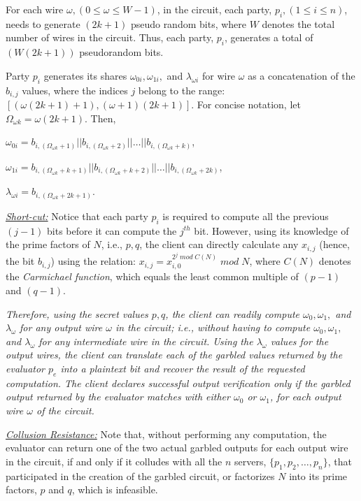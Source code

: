 \documentclass[10pt,journal,cspaper,compsoc]{IEEEtran}
\begin{document}
For each wire $\omega, (0\le \omega \le W-1)$, in the circuit, each party, $p_i, (1\le i\le n)$, needs to generate $(2k+1)$ pseudo random bits, where $W$ denotes the total number of wires in the circuit. Thus, each party, $p_i$, generates a total of $(W(2k+1))$ pseudorandom bits.


Party $p_i$ generates its shares $\omega_{0i},\omega_{1i},$ and $\lambda_{\omega i}$ for wire $\omega$ as a concatenation of the $b_{i,j}$ values, where the indices $j$ belong to the range: $[(\omega(2k+1)+1),(\omega+1)(2k+1)]$. For concise notation, let $\Omega_{\omega k}=\omega(2k+1)$. Then,


$\omega_{0i}=b_{i,(\Omega_{\omega k}+1)} || b_{i,(\Omega_{\omega k}+2)} || \ldots || b_{i,(\Omega_{\omega k}+k)}$,


$\omega_{1i}=b_{i,(\Omega_{\omega k}+k+1)} || b_{i,(\Omega_{\omega k}+k+2)} || \ldots || b_{i,(\Omega_{\omega k}+2k)}$,


$\lambda_{\omega i}=b_{i,(\Omega_{\omega k}+2k+1)}$.


\underline{\em Short-cut:} Notice that each party $p_i$ is required to compute all the previous $(j-1)$ bits before it can compute the $j^{th}$ bit. However, using its knowledge of the prime factors of $N$, i.e., $p,q$, the client can directly calculate any $x_{i,j}$ (hence, the bit $b_{i,j}$) using the relation: $x_{i,j}=x_{i,0}^{2^{j}\; mod\; C(N)}\; mod\; N$, where $C(N)$ denotes the {\em Carmichael function}, which equals the least common multiple of $(p-1)$ and $(q-1)$.


{\em Therefore, using the secret values $p,q$, the client can readily compute $\omega_0,\omega_1,$ and $\lambda_\omega$ for any output wire $\omega$ in the circuit; i.e., without having to compute $\omega_0,\omega_1,$ and $\lambda_\omega$ for any intermediate wire in the circuit. Using the $\lambda_\omega$ values for the output wires, the client can translate each of the garbled values returned by the evaluator $p_e$ into a plaintext bit and recover the result of the requested computation. The client declares successful output verification only if the garbled output returned by the evaluator matches with either $\omega_0$ or $\omega_1$, for each output wire $\omega$ of the circuit.}


\underline{\em Collusion Resistance:} Note that, without performing any computation, the evaluator can return one of the two actual garbled outputs for each output wire in the circuit, if and only if it colludes with all the $n$ servers, $\{p_1, p_2, \ldots, p_n\}$, that participated in the creation of the garbled circuit, or factorizes $N$ into its prime factors, $p$ and $q$, which is infeasible.
\end{document}
